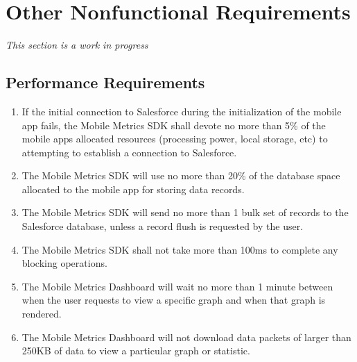 \documentclass[12pt,oneside,letterpaper]{article}
\begin{document}
\clearpage
\section{Other Nonfunctional Requirements}
\emph{This section is a work in progress}
\subsection{Performance Requirements}
\begin{enumerate}
\item If the initial connection to Salesforce during the initialization of the mobile app fails, the Mobile Metrics SDK shall devote no more than 5\% of the mobile apps allocated resources (processing power, local storage, etc) to attempting to establish a connection to Salesforce.
%
%
\item The Mobile Metrics SDK will use no more than 20\% of the database space allocated to the mobile app for storing data records.
\item The Mobile Metrics SDK will send no more than 1 bulk set of records to the Salesforce database, unless a record flush is requested by the user.
\item The Mobile Metrics SDK shall not take more than 100ms to complete any blocking operations.
\item The Mobile Metrics Dashboard will wait no more than 1 minute between when the user requests to view a specific graph and when that graph is rendered.
\item The Mobile Metrics Dashboard will not download data packets of larger than 250KB of data to view a particular graph or statistic.

\end{enumerate}
\end{document}
